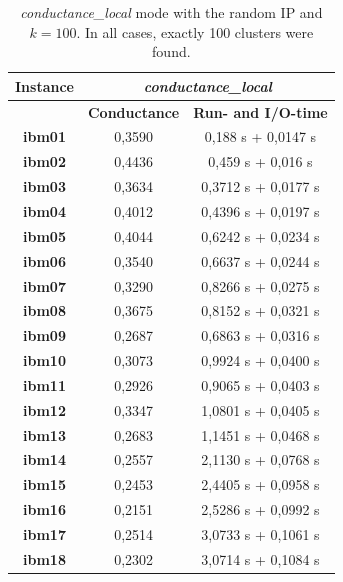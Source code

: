 \documentclass[acmsmall,nonacm,screen,review]{acmart}
\begin{document}
\begin{table}
    \centering
    \small
    \begin{tabular}{|c|c|c|} \hline
        \textbf{Instance} & \multicolumn{2}{|c|}{\textit{conductance\_local}} \\ \hline
                       & \textbf{Conductance} & \textbf{Run- and I/O-time} \\ \hline
        \textbf{ibm01} & 0,3590 & 0,188 s + 0,0147 s \\ 
        \textbf{ibm02} & 0,4436 & 0,459 s + 0,016 s  \\ 
        \textbf{ibm03} & 0,3634 & 0,3712 s + 0,0177 s\\ 
        \textbf{ibm04} & 0,4012 & 0,4396 s + 0,0197 s\\ 
        \textbf{ibm05} & 0,4044 & 0,6242 s + 0,0234 s\\ 
        \textbf{ibm06} & 0,3540 & 0,6637 s + 0,0244 s\\ 
        \textbf{ibm07} & 0,3290 & 0,8266 s + 0,0275 s\\ 
        \textbf{ibm08} & 0,3675 & 0,8152 s + 0,0321 s\\ 
        \textbf{ibm09} & 0,2687 & 0,6863 s + 0,0316 s\\ 
        \textbf{ibm10} & 0,3073 & 0,9924 s + 0,0400 s\\ 
        \textbf{ibm11} & 0,2926 & 0,9065 s + 0,0403 s\\ 
        \textbf{ibm12} & 0,3347 & 1,0801 s + 0,0405 s\\ 
        \textbf{ibm13} & 0,2683 & 1,1451 s + 0,0468 s\\ 
        \textbf{ibm14} & 0,2557 & 2,1130 s + 0,0768 s\\ 
        \textbf{ibm15} & 0,2453 & 2,4405 s + 0,0958 s\\ 
        \textbf{ibm16} & 0,2151 & 2,5286 s + 0,0992 s\\ 
        \textbf{ibm17} & 0,2514 & 3,0733 s + 0,1061 s\\ 
        \textbf{ibm18} & 0,2302 & 3,0714 s + 0,1084 s\\ \hline
    \end{tabular}
    \caption{\textit{conductance\_local} mode with the random IP and $k = 100$. 
    In all cases, exactly 100 clusters were found.}
    \label{tab:comparison_k}
\end{table}
\end{document}
